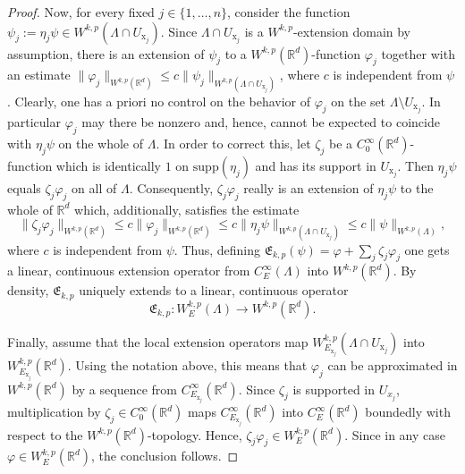 \documentclass[10pt,leqno]{amsart}
\theoremstyle{definition}
\numberwithin{equation}{section}
\begin{document}
\begin{proof}
 Now, for every fixed $j \in \{1, \ldots, n\}$, consider the function $\psi_j
 := \eta_j \psi \in W^{k,p}(\Lambda \cap U_{{{\mathrm x}}_j})$. Since $\Lambda \cap
 U_{{{\mathrm x}}_j}$ is a $W^{k,p}$-extension domain by assumption, there is an
 extension of $\psi_j$ to a $W^{k,p}({{\mathbb R}}^d)$-function $\varphi_j$ together with
 an estimate $\|\varphi_j\|_{W^{k,p}({{\mathbb R}}^d)} \le c
 \|\psi_j\|_{W^{k,p}( \Lambda \cap U_{{{\mathrm x}}_j})}$, where $c$ is independent
 from $\psi$. Clearly, one has a priori no control on the behavior of
 $\varphi_j$ on the set $\Lambda \setminus U_{{{\mathrm x}}_j}$. In particular
 $\varphi_j$ may there be nonzero and, hence, cannot be expected to coincide
 with $\eta_j \psi$ on the whole of $\Lambda$. In order to correct
 this, let $\zeta_j$ be a $C^\infty_0({{\mathbb R}}^d)$-function which is identically $1$
 on $\mathrm{supp}(\eta_j)$ and has its support in $U_{{{\mathrm x}}_j}$. Then
 $\eta_j \psi$ equals $\zeta_j \varphi_j $ on all of $\Lambda$. Consequently,
 $\zeta_j \varphi_j$ really is an extension of $\eta_j \psi$ to the whole of
 ${{\mathbb R}}^d$ which, additionally, satisfies the estimate
 \[ \| \zeta_j \varphi_j \|_{W^{k,p}({{\mathbb R}}^d)} \le c \| \varphi_j
	\|_{W^{k,p}({{\mathbb R}}^d)}\le c \| \eta_j \psi
	\|_{W^{k,p}(\Lambda \cap U_{{{\mathrm x}}_j})} \le c
	\|\psi\|_{W^{k,p}(\Lambda)},
 \]
 where $c$ is independent from $\psi$. Thus, defining $\mathfrak E_{k,p}(\psi) =
 \varphi + \sum_j \zeta_j \varphi_j$ one gets a linear, continuous extension
 operator from $C^\infty_E(\Lambda)$ into $W^{k,p}({{\mathbb R}}^d)$. By density,
 $\mathfrak{E}_{k,p}$ uniquely extends to a linear, continuous operator
 \begin{equation*}
  \mathfrak{E}_{k,p}:W^{k,p}_E(\Lambda) \to W^{k,p}({{\mathbb R}}^d).
\end{equation*} 

 Finally, assume that the local extension operators map $W^{k,p}_{E_{{{\mathrm x}}_j}}
(\Lambda \cap U_{{{\mathrm x}}_j})$ into $W^{k,p}_{E_{{{\mathrm x}}_j}}({{\mathbb R}}^d)$. Using the notation
above, this means that $\varphi_j$ can be approximated in $W^{k,p}({{\mathbb R}}^d)$ by a
sequence from $C_{E_{{{\mathrm x}}_j}}^\infty({{\mathbb R}}^d)$. Since $\zeta_j$ is supported in
$U_{x_j}$, multiplication by $\zeta_j \in C_0^\infty({{\mathbb R}}^d)$ maps
$C_{E_{{{\mathrm x}}_j}}^\infty({{\mathbb R}}^d)$ into $C_{E}^\infty({{\mathbb R}}^d)$ boundedly with respect
to the $W^{k,p}({{\mathbb R}}^d)$-topology. Hence, $\zeta_j \varphi_j \in
W^{k,p}_E({{\mathbb R}}^d)$. Since in any case $\varphi \in W^{k,p}_E({{\mathbb R}}^d)$, the
conclusion follows.
\end{proof}
\end{document}

